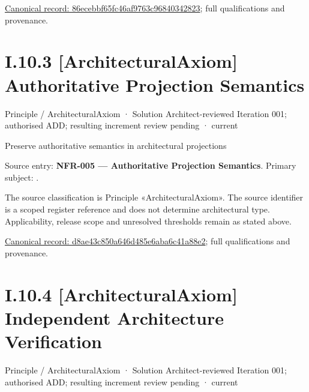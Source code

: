 {\footnotesize \href{../../../../../../../continuum/motivation/principle/architectural-axiom/86ecebbf65fc46af9763c96840342823.md}{Canonical record: 86ecebbf65fc46af9763c96840342823}; full qualifications and provenance.}\par
\section*{I.10.3 [ArchitecturalAxiom] Authoritative Projection Semantics}
\label{navigation:I.10.3}

\label{element:d8ae43c850a646d485e6aba6c41a88e2}
{\small Principle / ArchitecturalAxiom · Solution Architect-reviewed Iteration 001; authorised ADD; resulting increment review pending · current}\par

Preserve authoritative semantics in architectural projections



Source entry: \textbf{NFR-005 — Authoritative Projection Semantics}. Primary subject: \texttt{}.



The source classification is Principle «ArchitecturalAxiom». The source identifier is a scoped register reference and does not determine architectural type. Applicability, release scope and unresolved thresholds remain as stated above.


{\footnotesize \href{../../../../../../../continuum/motivation/principle/architectural-axiom/d8ae43c850a646d485e6aba6c41a88e2.md}{Canonical record: d8ae43c850a646d485e6aba6c41a88e2}; full qualifications and provenance.}\par
\section*{I.10.4 [ArchitecturalAxiom] Independent Architecture Verification}
\label{navigation:I.10.4}

\label{element:82d29abf230d478aaf42ecb73ecbd01e}
{\small Principle / ArchitecturalAxiom · Solution Architect-reviewed Iteration 001; authorised ADD; resulting increment review pending · current}\par

